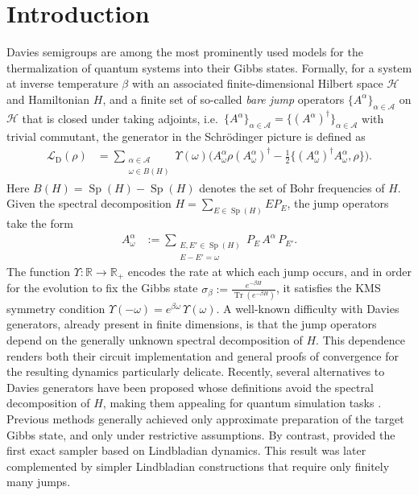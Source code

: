 \documentclass[11pt]{amsart}
\newcommand{\1}{\mathbbm{1}}
\newcommand{\Tr}{\operatorname{Tr}}
\theoremstyle{plain}
\theoremstyle{definition}
\theoremstyle{remark}
\numberwithin{equation}{section}
\begin{document}
\section{Introduction}
 


Davies semigroups \cite{Davies1974} are among the most prominently used models for the thermalization of quantum systems into their Gibbs states. Formally, for a system at inverse temperature $\beta$ with an associated finite-dimensional Hilbert space $\mathcal{H}$ and Hamiltonian $H$, and a finite set of so-called \emph{bare jump} operators $\{A^\alpha\}_{\alpha\in\mathcal{A}}$ on $\mathcal{H}$ that is closed under taking adjoints, i.e.~$\{A^\alpha\}_{\alpha\in\mathcal{A}}=\{(A^\alpha)^\dagger\}_{\alpha\in\mathcal{A}}$ with trivial commutant, the generator in the Schr\"{o}dinger picture is defined as
\begin{align}\label{eq:Davies}
\mathcal{L}_{\operatorname{D}}(\rho)
&\!= \!\!\!\!\!\sum_{\substack{\alpha\in\mathcal{A}\\\omega\in B(H)}} \!\!\!\!\Upsilon(\omega)
   \Big( A^\alpha_\omega \rho (A^\alpha_\omega)^\dagger
   - \tfrac{1}{2}\{(A^\alpha_\omega)^\dagger A^\alpha_\omega, \rho\} \Big).
\end{align}
Here $B(H)=\operatorname{Sp}(H)-\operatorname{Sp}(H)$ denotes the set of Bohr frequencies of $H$. Given the spectral decomposition $H=\sum_{E\in\operatorname{Sp}(H)}EP_E$, the jump operators take the form
\begin{align*}
A^\alpha_\omega
&:= \sum_{\substack{E,E'\in\operatorname{Sp}(H)\\ E-E'=\omega}}
    P_{E} \, A^\alpha \, P_{E'}.
\end{align*}
The function $\Upsilon:\mathbb{R}\to\mathbb{R}_+$ encodes the rate at which each jump occurs, and in order for the evolution to fix the Gibbs state $\sigma_\beta := \frac{e^{-\beta H}}{\Tr(e^{-\beta H})}$, it satisfies the KMS symmetry condition $\Upsilon(-\omega) = e^{\beta \omega}\,\Upsilon(\omega)$. A well-known difficulty with Davies generators, already present in finite dimensions, is that the jump operators depend on the generally unknown spectral decomposition of $H$. This dependence renders both their circuit implementation and general proofs of convergence for the resulting dynamics particularly delicate. Recently, several alternatives to Davies generators have been proposed whose definitions avoid the spectral decomposition of $H$, making them appealing for quantum simulation tasks \cite{wocjan2023szegedy,rall2023thermal,chen2023quantum}. Previous methods generally achieved only approximate preparation of the target Gibbs state, and only under restrictive assumptions. By contrast, \cite{chen2023efficient} provided the first exact sampler based on Lindbladian dynamics. This result was later complemented by simpler Lindbladian constructions \cite{ding2025efficient,gilyen2024quantum} that require only finitely many jumps.
\end{document}
